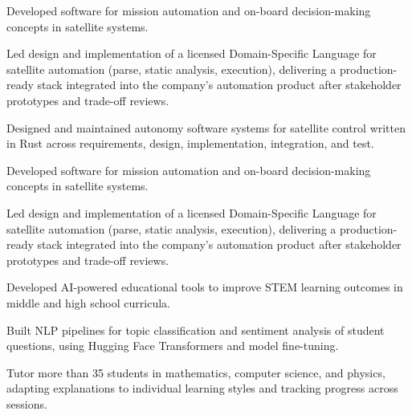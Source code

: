 \begin{cvitems}
    {
    \item Developed software for mission automation and on-board decision-making concepts in satellite systems.
    \item Led design and implementation of a licensed Domain-Specific Language for satellite automation (parse, static analysis, execution), delivering a production-ready stack integrated into the company's automation product after stakeholder prototypes and trade-off reviews.
    }
    {
    \item Designed and maintained autonomy software systems for satellite control written in Rust across requirements, design, implementation, integration, and test.
    \item Developed software for mission automation and on-board decision-making concepts in satellite systems.
    \item Led design and implementation of a licensed Domain-Specific Language for satellite automation (parse, static analysis, execution), delivering a production-ready stack integrated into the company's automation product after stakeholder prototypes and trade-off reviews.
    }
\end{cvitems}

\begin{cvitems}
    \item Developed AI-powered educational tools to improve STEM learning outcomes in middle and high school curricula.
    {
        \item Built NLP pipelines for topic classification and sentiment analysis of student questions, using Hugging Face Transformers and model fine-tuning.
    }{
    }
\end{cvitems}

\begin{cvitems}
    \item Tutor more than 35 students in mathematics, computer science, and physics, adapting explanations to individual learning styles and tracking progress across sessions.
\end{cvitems}
